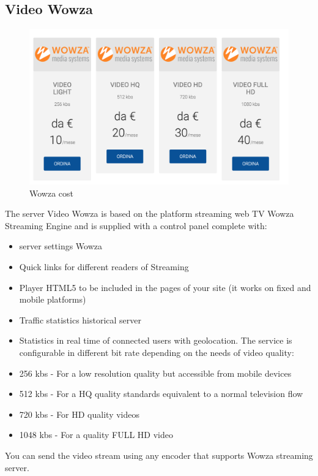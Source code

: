 \subsection{Video Wowza}
\label{sec:Video Wowza}
\begin{figure}[!htb]
 \centering
 \includegraphics[width=1.0\linewidth]{images/chapter2/wowza.png}\hfill
 \caption[Wowza cost]{Wowza cost}
 \label{fig:fourV}
\end{figure}

 The server Video Wowza is based on the platform streaming web TV Wowza Streaming Engine and is supplied with a control panel complete with:
\begin{itemize}

\item server settings Wowza
\item Quick links for different readers of Streaming
\item Player HTML5 to be included in the pages of your site (it works on fixed and mobile platforms)
\item Traffic statistics historical server
\item Statistics in real time of connected users with geolocation. The service is configurable in different bit rate depending on the needs of video quality:
\item 256 kbs - For a low resolution quality but accessible from mobile devices
\item 512 kbs - For a HQ quality standards equivalent to a normal television flow
\item 720 kbs - For HD quality videos
\item 1048 kbs - For a quality FULL HD video
\end{itemize}

You can send the video stream using any encoder that supports Wowza streaming server.

